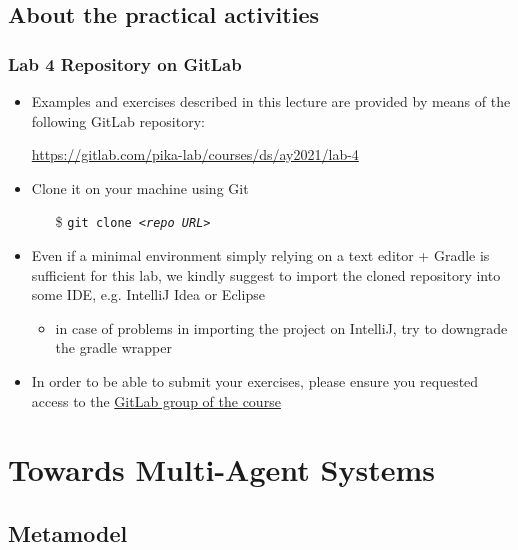 \documentclass[presentation]{beamer}\mode<presentation>{\usetheme{AMSCesenaPurpleAndGold}}
\newcommand{\labN}{4}
\newcommand{\labGroup}{https://gitlab.com/pika-lab/courses/ds/ay2021}
\newcommand{\labRepo}{\labGroup/lab-\labN}
\begin{document}
\subsection{About the practical activities}

\begin{frame}
\frametitle{Lab \labN{} Repository on GitLab}

	\begin{itemize}
		\item Examples and exercises described in this lecture are provided by means of the following GitLab repository:
		\begin{center}
			\url{\labRepo}
		\end{center}
		
		\vfill
		
		\item Clone it on your machine using Git
		\begin{itemize}
		    \item[\$] \texttt{git clone \textit{<repo URL>}}
		\end{itemize}
		
		\vfill
		
		\item Even if a minimal environment simply relying on a text editor + Gradle is sufficient for this lab, we kindly suggest to import the cloned repository into some IDE, e.g. IntelliJ Idea or Eclipse
		\begin{itemize}
		    \item in case of problems in importing the project on IntelliJ, try to downgrade the gradle wrapper
		\end{itemize}
		
		\vfill
		
		\item In order to be able to submit your exercises, please ensure you requested access to the \href{\labGroup}{GitLab group of the course}
	\end{itemize}

\end{frame}

\section{Towards Multi-Agent Systems}

\subsection{Metamodel}
\end{document}
